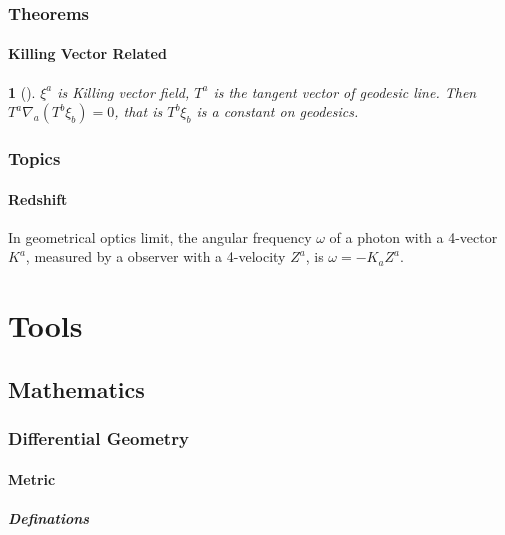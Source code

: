 \documentclass[11pt]{book}
\begin{document}
\section{Theorems}

\subsection{Killing Vector Related}

\newtheorem{theorem}{}[chapter]

\begin{theorem}[]
$\xi^a$ is Killing vector field, $T^a$ is the tangent vector of geodesic line. Then $T^a\nabla_a(T^b\xi_b)=0$, that is $T^b\xi_b$ is a constant on geodesics.
\end{theorem}




\section{Topics}
\subsection{Redshift}

In geometrical optics limit, the angular frequency $\omega$ of a photon with a 4-vector $K^a$, measured by a observer with a 4-velocity $Z^a$, is $\omega=-K_aZ^a$.









\part{Tools}

\chapter{Mathematics}

\section{Differential Geometry}

\subsection{Metric}

\subsubsection{Definations}
\end{document}
